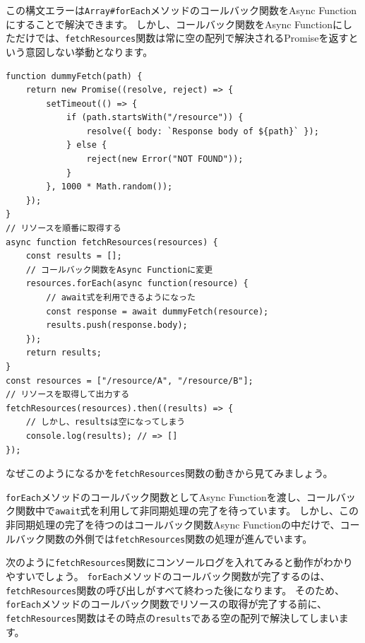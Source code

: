 この構文エラーは\texttt{Array\#forEach}メソッドのコールバック関数をAsync
Functionにすることで解決できます。 しかし、コールバック関数をAsync
Functionにしただけでは、\texttt{fetchResources}関数は常に空の配列で解決されるPromiseを返すという意図しない挙動となります。

\begin{lstlisting}
function dummyFetch(path) {
    return new Promise((resolve, reject) => {
        setTimeout(() => {
            if (path.startsWith("/resource")) {
                resolve({ body: `Response body of ${path}` });
            } else {
                reject(new Error("NOT FOUND"));
            }
        }, 1000 * Math.random());
    });
}
// リソースを順番に取得する
async function fetchResources(resources) {
    const results = [];
    // コールバック関数をAsync Functionに変更
    resources.forEach(async function(resource) {
        // await式を利用できるようになった
        const response = await dummyFetch(resource);
        results.push(response.body);
    });
    return results;
}
const resources = ["/resource/A", "/resource/B"];
// リソースを取得して出力する
fetchResources(resources).then((results) => {
    // しかし、resultsは空になってしまう
    console.log(results); // => []
});
\end{lstlisting}

なぜこのようになるかを\texttt{fetchResources}関数の動きから見てみましょう。

\texttt{forEach}メソッドのコールバック関数としてAsync
Functionを渡し、コールバック関数中で\texttt{await}式を利用して非同期処理の完了を待っています。
しかし、この非同期処理の完了を待つのはコールバック関数Async
Functionの中だけで、コールバック関数の外側では\texttt{fetchResources}関数の処理が進んでいます。

次のように\texttt{fetchResources}関数にコンソールログを入れてみると動作がわかりやすいでしょう。
\texttt{forEach}メソッドのコールバック関数が完了するのは、\texttt{fetchResources}関数の呼び出しがすべて終わった後になります。
そのため、\texttt{forEach}メソッドのコールバック関数でリソースの取得が完了する前に、\texttt{fetchResources}関数はその時点の\texttt{results}である空の配列で解決してしまいます。

